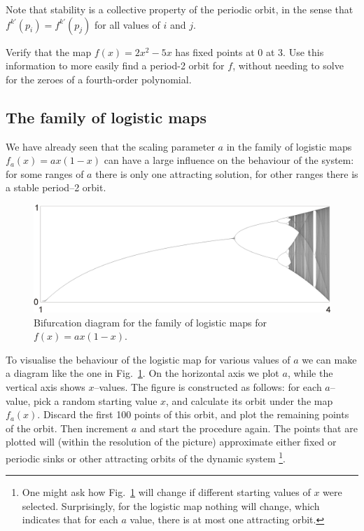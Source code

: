 Note that stability is a collective property of the periodic orbit, in the sense that $f^{k'}(p_i) = f^{k'}(p_j)$ for all values of $i$ and $j$.

\begin{sidebar}
\begin{ex}
Verify that the map $f(x)=2x^2-5x$ has fixed points at 0 at 3. Use this information to more easily find a period-2 orbit for $f$, without needing to solve for the zeroes of a fourth-order polynomial.
\end{ex}
\end{sidebar}


\subsection{The family of logistic maps}

We have already seen that the scaling parameter $a$ in the family of logistic maps $f_a(x)=ax(1-x)$ can have a large influence on the behaviour of the system: for some ranges of $a$ there is only one attracting solution, for other ranges there is a stable period--2 orbit.

\begin{figure}
\centering
\includegraphics[width=15cm]{dynamic/figures/bifurcation}
\caption{Bifurcation diagram for the family of logistic maps for $f(x)=ax(1-x)$.}
\label{fig-bifur}
\end{figure} 

To visualise the behaviour of the logistic map for various values of $a$ we can make a diagram like the one in Fig.~\ref{fig-bifur}. On the horizontal axis we plot $a$, while the vertical axis shows $x$--values. The figure is constructed as follows: for each $a$--value, pick a random starting value $x$, and calculate its orbit under the map $f_a(x)$. Discard the first 100 points of this orbit, and plot the remaining points of the orbit. Then increment $a$ and start the procedure again. The points that are plotted will (within the resolution of the picture) approximate either fixed or periodic sinks or other attracting orbits of the dynamic system \footnote{One might ask how Fig.~\ref{fig-bifur} will change if different starting values of $x$ were selected. Surprisingly, for the logistic map nothing will change, which indicates that for each $a$ value, there is at most one attracting orbit.}.

